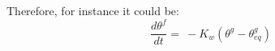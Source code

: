 Therefore, for instance it could be:
\begin{equation}
\frac{d \theta^f}{dt} =\ - K_w ({\theta^g - \theta^g_{eq}})
\end{equation}